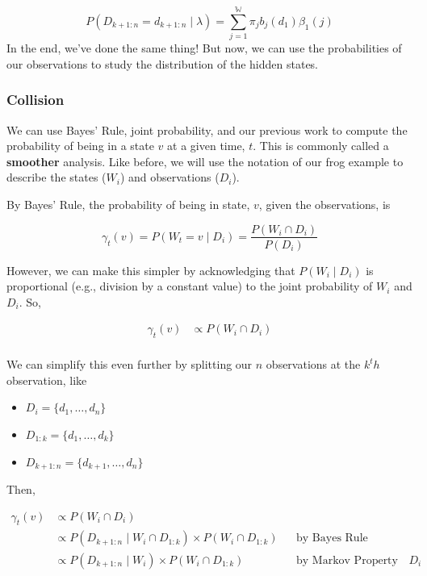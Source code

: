 \documentclass[
]{book}
\providecommand{\tightlist}{%
  \setlength{\itemsep}{0pt}\setlength{\parskip}{0pt}}
\begin{document}
\[P(D_{k+1:n} =d_{k+1:n} \mid \lambda) = \sum^\mathbb{W}_{j=1}\pi_j b_j(d_1)\beta_1(j)\]
In the end, we've done the same thing! But now, we can use the probabilities of our observations to study the distribution of the hidden states.

\hypertarget{collision}{%
\subsubsection*{Collision}\label{collision}}

We can use Bayes' Rule, joint probability, and our previous work to compute the probability of being in a state \(v\) at a given time, \(t\). This is commonly called a \textbf{smoother} analysis. Like before, we will use the notation of our frog example to describe the states (\(W_i\)) and observations (\(D_i\)).

By Bayes' Rule, the probability of being in state, \(v\), given the observations, is

\[\gamma_t(v) =  P(W_t = v \mid D_i) = \frac{P(W_i \cap D_i )}{P(D_i)} \]

However, we can make this simpler by acknowledging that \(P(W_i \mid D_i)\) is proportional (e.g., division by a constant value) to the joint probability of \(W_i\) and \(D_i\). So,

\begin{align*}
\gamma_t(v)  &\propto P(W_i \cap D_i) \\
\end{align*}

We can simplify this even further by splitting our \(n\) observations at the \(k^th\) observation, like

\begin{itemize}
\tightlist
\item
  \(D_{i} = \{d_1, \dots, d_n\}\)
\item
  \(D_{1:k} = \{d_1, \dots, d_k\}\)
\item
  \(D_{k+1:n} = \{d_{k+1}, \dots, d_{n}\}\)
\end{itemize}

Then,

\begin{align*}
\gamma_t(v)  &\propto P(W_i \cap D_i) \\
&\propto P(D_{k+1:n} \mid W_i \cap D_{1:k}) \times P(W_i  \cap D_{1:k}) && \text{by Bayes Rule}\\
&\propto P(D_{k+1:n} \mid W_i) \times P(W_i  \cap D_{1:k}) && \text{by Markov Property of } D_i\\
\end{align*}
\end{document}
